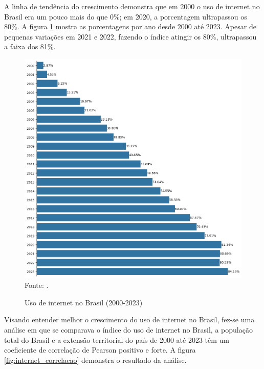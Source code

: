 A linha de tendência do crescimento demonstra que em 2000 o uso de internet no Brasil era um pouco mais do que 0\%; em 2020, a porcentagem ultrapassou os 80\%. A figura \ref{fig:uso_internet_brasil_itu} mostra as porcentagens por ano desde 2000 até 2023. Apesar de pequenas variações em 2021 e 2022, fazendo o índice atingir os 80\%, ultrapassou a faixa dos 81\%.

\begin{figure}[H]
    \centering
    \caption{Uso de internet no Brasil (2000-2023)}
    \includegraphics[width=1\linewidth]{figuras/internet/barplot_uso_internet_brasil_itu.png}
    \label{fig:uso_internet_brasil_itu}
    \footnotesize{Fonte: \cite{ITU_uso_internet_brasil}.}
\end{figure}

Visando entender melhor o crescimento do uso de internet no Brasil, fez-se uma análise em que se comparava o índice do uso de internet no Brasil, a população total do Brasil e a extensão territorial do país de 2000 até 2023 têm um coeficiente de correlação de Pearson positivo e forte. A figura \ref{fig:internet_correlacao} demonstra o resultado da análise.

